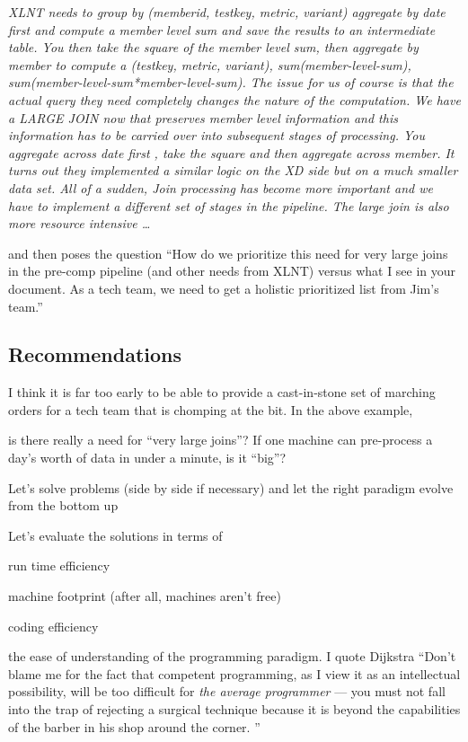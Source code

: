 {\it 
XLNT needs to group by (memberid, testkey, metric, variant)  aggregate
by date first and compute a member level sum and save the results to an
intermediate table. You then take  the square of the member level sum,
then aggregate by member to compute a (testkey, metric,
variant), sum(member-level-sum),
sum(member-level-sum*member-level-sum). 
The issue for us of course is that the actual query
they need completely changes the nature of the
computation. We have a LARGE JOIN now that preserves
member level information and this information has to be
carried over into subsequent stages of processing. You
aggregate across date first , take the square and then
aggregate across member. It turns out they implemented
a similar logic on the XD side but on a much smaller
data set. All of a sudden, Join processing has become
more important and we have to implement a different set
of stages in the pipeline. The large join is also more
resource intensive \ldots
}

and then poses the question ``How do we prioritize this need for very
large joins in the pre-comp pipeline (and other needs from XLNT) versus
what I see in your document. As a tech team, we need to get a holistic
prioritized list from Jim's team.''

\subsection{Recommendations}

\bi
\item I think it is far too early to be able to provide a cast-in-stone
set of marching orders for a tech team that is chomping at the bit. In
the above example, 
\bi
\item is there really a need for ``very large joins''? 
If one machine can pre-process a day's worth of data in under a minute, 
is it ``big''?
\ei
\item Let's solve problems (side by side if necessary) and let the right
paradigm evolve from the bottom up
\item Let's evaluate the solutions in terms of 
\be
\item run time efficiency
\item machine footprint (after all, machines aren't free)
\item coding efficiency
\item the ease of understanding of the programming paradigm. 
I quote Dijkstra ``Don't
blame me for the fact that competent programming, as I view it as an
intellectual possibility, will be too difficult for {\it the average
programmer} --- you must not fall into the trap of rejecting a surgical
technique because it is beyond the capabilities of the barber in his
shop around the corner. ''
\ee
\ei




